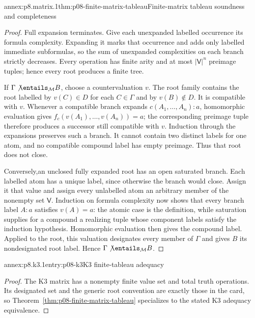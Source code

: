 
\begin{annexitem}{annex:p8.matrix.1}{thm:p08-finite-matrix-tableau}{Finite-matrix tableau soundness and completeness}
\begin{proof}
Full expansion terminates.  Give each unexpanded labelled occurrence its
formula complexity.  Expanding it marks that occurrence and adds only labelled
immediate subformulas, so the sum of unexpanded complexities on each branch
strictly decreases.  Every operation has finite arity and at most
\(\lvert\mathsf V\rvert^n\) preimage tuples; hence every root produces a
finite tree.

If \(\Gamma\not\entails_{\mathcal M}B\), choose a countervaluation \(v\).
The root family contains the root labelled by \(v(C)\in D\) for each
\(C\in\Gamma\) and by \(v(B)\notin D\).  It is compatible with \(v\).
Whenever a compatible branch expands
\(c(A_1,\ldots,A_n){:}a\), homomorphic evaluation gives
\(f_c(v(A_1),\ldots,v(A_n))=a\); the corresponding preimage tuple therefore
produces a successor still compatible with \(v\).  Induction through the
expansions preserves such a branch.  It cannot contain two distinct labels for
one atom, and no compatible compound label has empty preimage.  Thus that root
does not close.

Conversely,\linebreak an unclosed fully expanded root has an open saturated branch.
Each labelled atom has a unique label, since otherwise the branch would close.
Assign it that value and assign every unlabelled atom an arbitrary member of
the nonempty set \(\mathsf V\).  Induction on formula complexity now shows
that every branch label \(A{:}a\) satisfies \(v(A)=a\): the atomic case is the
definition, while saturation supplies for a compound a realizing tuple whose
component labels satisfy the induction hypothesis.  Homomorphic evaluation
then gives the compound label.  Applied to the root, this valuation designates
every member of \(\Gamma\) and gives \(B\) its nondesignated root label.
Hence \(\Gamma\not\entails_{\mathcal M}B\).
\end{proof}
\end{annexitem}

\begin{annexitem}{annex:p8.k3.1}{entry:p08-k3}{K3 finite-tableau adequacy}
\begin{proof}
The K3 matrix has a nonempty finite value set and total truth operations.  Its
designated set and the generic root convention are exactly those in the card,
so Theorem~\ref{thm:p08-finite-matrix-tableau} specializes to the stated K3
adequacy equivalence.
\end{proof}
\end{annexitem}

